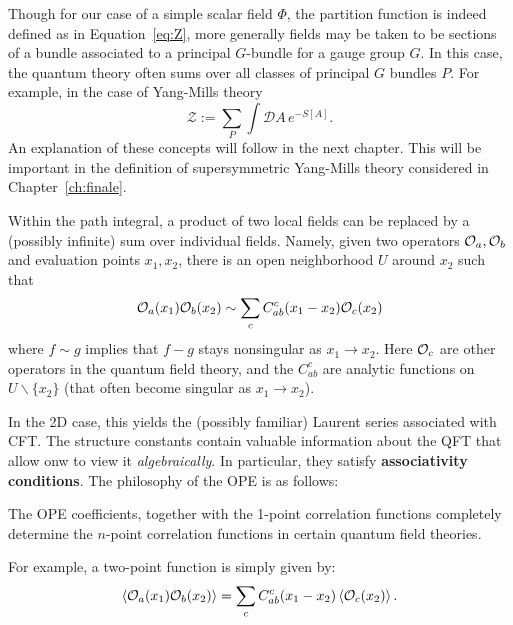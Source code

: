 		
		\begin{remark}
			Though for our case of a simple scalar field $\Phi$, the partition function is indeed defined as in Equation~\eqref{eq:Z}, more generally fields may be taken to be sections of a bundle associated to a principal $G$-bundle for a gauge group $G$. In this case, the quantum theory often sums over all classes of principal $G$ bundles $P$. For example, in the case of Yang-Mills theory
			\begin{equation}
				\mathcal Z := \sum_{P} \int \mathcal DA \, e^{- S[A]}.
			\end{equation}
			An explanation of these concepts will follow in the next chapter. This will be important in the definition of supersymmetric Yang-Mills theory considered in Chapter~\ref{ch:finale}.
		\end{remark}
		

		\begin{phys}
			 Within the path integral, a product of two local fields can be replaced by a (possibly infinite) sum over individual fields. Namely, given two operators $\mathcal{O}_a, \mathcal{O}_b$ and evaluation points $x_1, x_2$, there is an open neighborhood $U$ around $x_2$ such that
			\begin{equation}
				\mathcal{O}_a (x_1) \mathcal{O}_b(x_2) \sim \sum_c C_{ab}^c(x_1-x_2) \mathcal{O}_c(x_2)
			\end{equation}
			where $f \sim g$ implies that $f - g$ stays nonsingular as $x_1 \to x_2$.
		Here $\mathcal{O}_c$ are other operators in the quantum field theory, and the $C_{ab}^c$ are analytic functions on $U \backslash \{ x_2 \}$ (that often become singular as $x_1 \to x_2$). 
		\end{phys}
	
		In the 2D case, this yields the (possibly familiar) Laurent series associated with CFT. The structure constants contain valuable information about the QFT that allow onw to view it \emph{algebraically}. In particular, they satisfy \textbf{associativity conditions}. The philosophy of the OPE is as follows: %
		\begin{idea}
			The OPE coefficients, together with the 1-point correlation functions completely determine the $n$-point correlation functions in certain quantum field theories. 
		\end{idea}
	\noindent 	For example, a two-point function is simply given by:
		\begin{equation}
			\left< \mathcal{O}_a(x_1) \mathcal{O}_b(x_2) \right> = \sum_c C^c_{ab}(x_1 - x_2) \left< \mathcal O_c (x_2) \right>.
		\end{equation}
	
